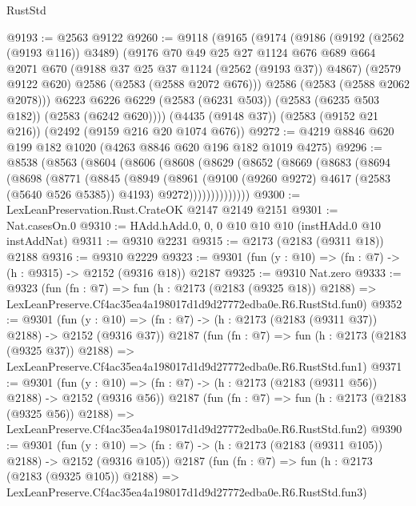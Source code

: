 \begin{lexlean}{RustStd}
\begin{coremodule}
@9193 := @2563 @9122
@9260 := @9118
    (@9165
      (@9174
        (@9186
          (@9192 (@2562 (@9193 @116)) @3489)
          (@9176
            @70
            @49
            @25
            @27
            @1124
            @676
            @689
            @664
            @2071
            @670
            (@9188 @37 @25 @37 @1124 (@2562 (@9193 @37)) @4867)
            (@2579 @9122 @620)
            @2586
            (@2583 (@2588 @2072 @676)))
          @2586
          (@2583 (@2588 @2062 @2078)))
        @6223
        @6226
        @6229
        (@2583 (@6231 @503))
        (@2583 (@6235 @503 @182))
        (@2583 (@6242 @620))))
    (@4435 (@9148 @37))
    (@2583 (@9152 @21 @216))
    (@2492 (@9159 @216 @20 @1074 @676))
@9272 := @4219 @8846 @620 @199 @182 @1020 (@4263 @8846 @620 @196 @182 @1019 @4275)
@9296 := @8538
    (@8563
      (@8604
        (@8606
          (@8608
            (@8629
              (@8652
                (@8669
                  (@8683
                    (@8694
                      (@8698
                        (@8771
                          (@8845
                            (@8949
                              (@8961
                                (@9100 (@9260 @9272) @4617 (@2583 (@5640 @526 @5385)) @4193)
                                @9272))))))))))))))
@9300 := LexLeanPreservation.Rust.CrateOK @2147 @2149 @2151
@9301 := Nat.casesOn.{0}
@9310 := HAdd.hAdd.{0, 0, 0} @10 @10 @10 (instHAdd.{0} @10 instAddNat)
@9311 := @9310 @2231
@9315 := @2173 (@2183 (@9311 @18)) @2188
@9316 := @9310 @2229
@9323 := @9301 (fun (y : @10) => (fn : @7) -> (h : @9315) -> @2152 (@9316 @18)) @2187
@9325 := @9310 Nat.zero
@9333 := @9323
    (fun (fn : @7) =>
    fun (h : @2173 (@2183 (@9325 @18)) @2188) =>
    LexLeanPreserve.Cf4ac35ea4a198017d1d9d27772edba0e.R6.RustStd.fun0)
@9352 := @9301
    (fun (y : @10) => (fn : @7) -> (h : @2173 (@2183 (@9311 @37)) @2188) -> @2152 (@9316 @37))
    @2187
    (fun (fn : @7) =>
    fun (h : @2173 (@2183 (@9325 @37)) @2188) =>
    LexLeanPreserve.Cf4ac35ea4a198017d1d9d27772edba0e.R6.RustStd.fun1)
@9371 := @9301
    (fun (y : @10) => (fn : @7) -> (h : @2173 (@2183 (@9311 @56)) @2188) -> @2152 (@9316 @56))
    @2187
    (fun (fn : @7) =>
    fun (h : @2173 (@2183 (@9325 @56)) @2188) =>
    LexLeanPreserve.Cf4ac35ea4a198017d1d9d27772edba0e.R6.RustStd.fun2)
@9390 := @9301
    (fun (y : @10) => (fn : @7) -> (h : @2173 (@2183 (@9311 @105)) @2188) -> @2152 (@9316 @105))
    @2187
    (fun (fn : @7) =>
    fun (h : @2173 (@2183 (@9325 @105)) @2188) =>
    LexLeanPreserve.Cf4ac35ea4a198017d1d9d27772edba0e.R6.RustStd.fun3)

\end{coremodule}
\end{lexlean}
